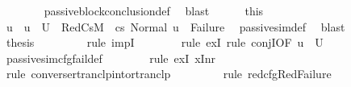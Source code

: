 \begin{isabellebody}
\ \ \ \ \ \ \isamarkupfalse%
\ passive{\isacharunderscore}{\kern0pt}block{\isacharunderscore}{\kern0pt}conclusion{\isacharunderscore}{\kern0pt}def\ \isamarkupfalse%
\ blast\isanewline
\ \ \ \ \isamarkupfalse%
\ this\ \isamarkupfalse%
\ u\ \ {\isachardoublequoteopen}u\ {\isasymin}\ U{}{\isachardoublequoteclose}\ \ RedCs{}{\isacharcolon}{\kern0pt}{\isachardoublequoteopen}M{\isacharcomma}{\kern0pt}{\isasymLambda}{}{\isacharcomma}{\kern0pt}{\isasymGamma}{\isacharcomma}{\kern0pt}{\isasymOmega}\ {\isasymturnstile}\ {\isasymlangle}cs{}{\isacharcomma}{\kern0pt}\ Normal\ u{\isasymrangle}\ {\isacharbrackleft}{\kern0pt}{\isasymrightarrow}{\isacharbrackright}{\kern0pt}\ Failure{\isachardoublequoteclose}\ \isamarkupfalse%
\ passive{\isacharunderscore}{\kern0pt}sim{\isacharunderscore}{\kern0pt}def\ \isamarkupfalse%
\ blast\isanewline
\ \ \ \ \isamarkupfalse%
\ {\isacharquery}{\kern0pt}thesis\ \isanewline
\ \ \ \ \ \ \isamarkupfalse%
\ {\isacharparenleft}{\kern0pt}rule\ impI{\isacharparenright}{\kern0pt}\isanewline
\ \ \ \ \ \ \isamarkupfalse%
\ {\isacharparenleft}{\kern0pt}rule\ exI{\isacharcomma}{\kern0pt}\ rule\ conjI{\isacharbrackleft}{\kern0pt}OF\ {\isacartoucheopen}u\ {\isasymin}\ U{}{\isacartoucheclose}{\isacharbrackright}{\kern0pt}{\isacharparenright}{\kern0pt}\isanewline
\ \ \ \ \ \ \isamarkupfalse%
\ passive{\isacharunderscore}{\kern0pt}sim{\isacharunderscore}{\kern0pt}cfg{\isacharunderscore}{\kern0pt}fail{\isacharunderscore}{\kern0pt}def\isanewline
\ \ \ \ \ \ \isamarkupfalse%
\ {\isacharparenleft}{\kern0pt}rule\ exI{\isacharbrackleft}{\kern0pt}\ {\isacharquery}{\kern0pt}x{\isacharequal}{\kern0pt}{\isachardoublequoteopen}Inr\ {\isacharparenleft}{\kern0pt}{\isacharparenright}{\kern0pt}{\isachardoublequoteclose}{\isacharbrackright}{\kern0pt}{\isacharparenright}{\kern0pt}\isanewline
\ \ \ \ \ \ \isamarkupfalse%
\ {\isacharparenleft}{\kern0pt}rule\ converse{\isacharunderscore}{\kern0pt}rtranclp{\isacharunderscore}{\kern0pt}into{\isacharunderscore}{\kern0pt}rtranclp{\isacharparenright}{\kern0pt}\isanewline
\ \ \ \ \ \ \ \isamarkupfalse%
\ {\isacharparenleft}{\kern0pt}rule\ red{\isacharunderscore}{\kern0pt}cfg{\isachardot}{\kern0pt}RedFailure{\isacharparenright}{\kern0pt}\isanewline

\end{isabellebody}
